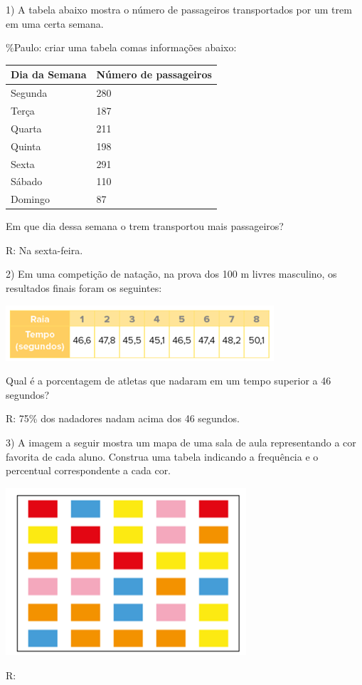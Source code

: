 1) A tabela abaixo mostra o número de passageiros transportados por um
trem em uma certa semana.

\%Paulo: criar uma tabela comas informações abaixo:

\begin{longtable}[]{@{}ll@{}}
\toprule
Dia da Semana & Número de passageiros\tabularnewline
\midrule
\endhead
Segunda & 280\tabularnewline
Terça & 187\tabularnewline
Quarta & 211\tabularnewline
Quinta & 198\tabularnewline
Sexta & 291\tabularnewline
Sábado & 110\tabularnewline
Domingo & 87\tabularnewline
\bottomrule
\end{longtable}

Em que dia dessa semana o trem transportou mais passageiros?

R: Na sexta-feira.

2) Em uma competição de natação, na prova dos 100 m livres masculino, os
resultados finais foram os seguintes:

\includegraphics[width=3.92708in,height=0.8125in]{./imgSAEB_6_MAT/media/image81.png}

Qual é a porcentagem de atletas que nadaram em um tempo superior a 46
segundos?

R: 75\% dos nadadores nadam acima dos 46 segundos.

3) A imagem a seguir mostra um mapa de uma sala de aula representando a
cor favorita de cada aluno. Construa uma tabela indicando a frequência e
o percentual correspondente a cada cor.

\includegraphics[width=3.52292in,height=2.45347in]{./imgSAEB_6_MAT/media/image82.png}

R:

